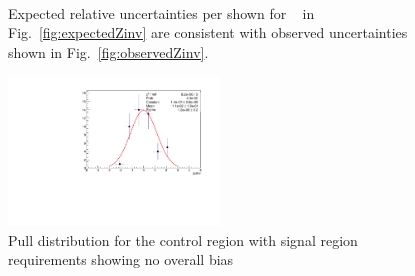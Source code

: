 \begin{figure}[h!]
  \centering
  ~~
  \\
  \caption{\label{fig:expectedObservedZinv}Expected relative uncertainties per \GeV shown for \zInv~ in Fig.~\ref{fig:expectedZinv} are consistent
  with observed uncertainties shown in Fig.~\ref{fig:observedZinv}.}
\end{figure}

\begin{figure}[]
  \centering
  \includegraphics[width=0.5\textwidth]{figures/template/pullAtMu.pdf}
  \caption{\label{fig:pullAt} Pull distribution for
  the \mj control region with signal region \alt requirements showing no overall bias}
\end{figure}

